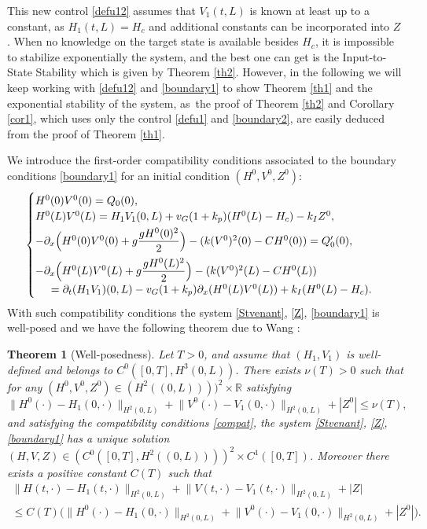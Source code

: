 \documentclass[JEP,XML,SOM,Unicode]{cedram}
\newtheorem{thm}{Theorem}[section]
\theoremstyle{definition}
\begin{document}
This new control \eqref{defu12} assumes that $V_{1}(t,L)$ is known at least up to a constant, as $H_{1}(t,L)=H_{c}$ and additional constants can be incorporated into $Z$.
When no knowledge on the target state is available besides $H_{c}$,
it is impossible to stabilize exponentially the system, and the best one can get is the Input-to-State Stability which is given by Theorem \ref{th2}.
However, in the following we will keep working with \eqref{defu12} and \eqref{boundary1} to show Theorem \ref{th1} and the exponential stability of the system, as~the proof of Theorem \ref{th2} and Corollary \ref{cor1}, which uses only the control \eqref{defu1} and \eqref{boundary2}, are easily deduced from the proof of Theorem \ref{th1}.

We introduce the first-order compatibility conditions associated to the boundary conditions \eqref{boundary1} for an initial condition $(H^{0},V^{0},Z^{0})$:
\begin{equation}\label{compat}
\begin{cases}
H^{0}(0)V^{0}(0)=Q_{0}(0),\\
H^{0}(L)V^{0}(L)=H_{1}V_{1}(0,L)+v_{G}(1+k_{p})(H^{0}(L)-H_{c})-k_{I}Z^{0},\\[3pt]
-\partial_{x}\Bigl(H^{0}(0)V^{0}(0)+g\dfrac{gH^{0}(0)^{2}}{2}\Bigr)-(k(V^{0})^{2}(0)-CH^{0}(0))=Q'_{0}(0),\\[8pt]
-\partial_{x}\Bigl(H^{0}(L)V^{0}(L)+g\dfrac{gH^{0}(L)^{2}}{2}\Bigr)-(k(V^{0})^{2}(L)-CH^{0}(L))\\
\hspace*{.5cm}=\partial_{t}(H_{1}V_{1})(0,L)
-v_{G}(1+k_{p})\partial_{x}(H^{0}(L)V^{0}(L))+k_{I}(H^{0}(L)-H_{c}).
\end{cases}
\end{equation}
With such compatibility conditions the system \eqref{Stvenant}, \eqref{Z}, \eqref{boundary1} is well-posed and we have the following theorem due to Wang \cite[Th.\,2.1]{Wang}:
\begin{thm}[Well-posedness]\label{th0}
Let $T>0$, and assume that
$(H_{1},V_{1})$ is well-defined and belongs to $C^{0}([0,T],H^{3}(0,L))$.
There exists $\nu(T)>0$
such that for any $(H^{0},V^{0},Z^{0})\in (H^{2}((0,L))))^{2}\times \mathbb{R}$ satisfying
\begin{equation*}
\lVert H^{0}(\cdot)-H_{1}(0,\cdot)\rVert_{H^{2}(0,L)}+\lVert V^{0}(\cdot)-V_{1}(0,\cdot)\rVert_{H^{2}(0,L)}+|Z^{0}|\leq \nu(T),
\end{equation*}
and satisfying the compatibility conditions \eqref{compat}, the system \eqref{Stvenant}, \eqref{Z}, \eqref{boundary1} has a unique solution $(H,V,Z)\in (C^{0}([0,T],H^{2}((0,L))))^{2}\times C^{1}([0,T])$. Moreover
there exists a positive constant $C(T)$ such that
\begin{multline}
\label{estimate}
\lVert H(t,\cdot)-H_{1}(t,\cdot)\rVert_{H^{2}(0,L)}+\lVert V(t,\cdot)-V_{1}(t,\cdot)\rVert_{H^{2}(0,L)}+|Z|\\
\leq C(T)\bigl(\lVert H^{0}(\cdot)-H_{1}(0,\cdot)\rVert_{H^{2}(0,L)}+\lVert V^{0}(\cdot)-V_{1}(0,\cdot)\rVert_{H^{2}(0,L)}+|Z^{0}|\bigr).
\end{multline}
\end{thm}
\end{document}

